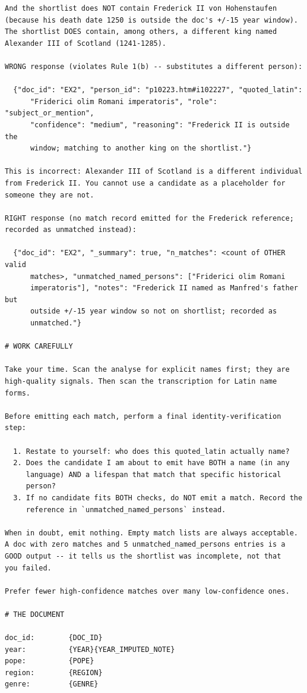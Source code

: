 \documentclass[12pt]{article}
\theoremstyle{definition}
\theoremstyle{remark}
\begin{document}
{\begin{verbatim}
And the shortlist does NOT contain Frederick II von Hohenstaufen
(because his death date 1250 is outside the doc's +/-15 year window).
The shortlist DOES contain, among others, a different king named
Alexander III of Scotland (1241-1285).

WRONG response (violates Rule 1(b) -- substitutes a different person):

  {"doc_id": "EX2", "person_id": "p10223.htm#i102227", "quoted_latin":
      "Friderici olim Romani imperatoris", "role": "subject_or_mention",
      "confidence": "medium", "reasoning": "Frederick II is outside the
      window; matching to another king on the shortlist."}

This is incorrect: Alexander III of Scotland is a different individual
from Frederick II. You cannot use a candidate as a placeholder for
someone they are not.

RIGHT response (no match record emitted for the Frederick reference;
recorded as unmatched instead):

  {"doc_id": "EX2", "_summary": true, "n_matches": <count of OTHER valid
      matches>, "unmatched_named_persons": ["Friderici olim Romani
      imperatoris"], "notes": "Frederick II named as Manfred's father but
      outside +/-15 year window so not on shortlist; recorded as
      unmatched."}

# WORK CAREFULLY

Take your time. Scan the analyse for explicit names first; they are
high-quality signals. Then scan the transcription for Latin name forms.

Before emitting each match, perform a final identity-verification step:

  1. Restate to yourself: who does this quoted_latin actually name?
  2. Does the candidate I am about to emit have BOTH a name (in any
     language) AND a lifespan that match that specific historical
     person?
  3. If no candidate fits BOTH checks, do NOT emit a match. Record the
     reference in `unmatched_named_persons` instead.

When in doubt, emit nothing. Empty match lists are always acceptable.
A doc with zero matches and 5 unmatched_named_persons entries is a
GOOD output -- it tells us the shortlist was incomplete, not that
you failed.

Prefer fewer high-confidence matches over many low-confidence ones.

# THE DOCUMENT

doc_id:        {DOC_ID}
year:          {YEAR}{YEAR_IMPUTED_NOTE}
pope:          {POPE}
region:        {REGION}
genre:         {GENRE}


\end{verbatim}}
\end{document}

